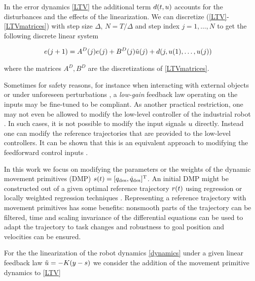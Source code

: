 \noindent In the error dynamics \eqref{LTV} the additional term $d(t,u)$ accounts for the disturbances and the effects of the linearization. We can discretize (\ref{LTV}-\ref{LTVmatrices}) with step size $\Delta$, $N = T/\Delta$ and step index $j = 1, \ldots, N$ to get the following discrete linear system

\begin{equation}
\begin{aligned}
e(j+1) = A^{D}(j)e(j) + B^{D}(j)\tilde{u}(j) + d(j, u(1), \ldots, u(j))
\end{aligned}
\label{discreteLTV}
\end{equation}

where the matrices $A^{D}, B^{D}$ are the discretizations of \eqref{LTVmatrices}. 

Sometimes for safety reasons, for instance when interacting with external objects or under unforeseen perturbations \cite{Schaal07}, a \emph{low-gain} feedback law operating on the inputs may be fine-tuned to be compliant. As another practical restriction, one may not even be allowed to modify the low-level controller of the industrial robot \cite{Longman2000}. In such cases, it is not possible to modify the input signals $u$ directly. Instead one can modify the reference trajectories that are provided to the low-level controllers. It can be shown that this is an equivalent approach to modifying the feedforward control inputs \cite{Bristow06}.

In this work we focus on modifying the parameters or the weights of the dynamic movement primitives (DMP) $s(t) = [q_{\text{des}},\dot{q}_{\text{des}}]^{\mathrm{T}}$. An initial DMP might be constructed out of a given optimal reference trajectory $r(t)$ using regression or locally weighted regression techniques \cite{Ijspeert13}. Representing a reference trajectory with movement primitives has some benefits: nonsmooth parts of the trajectory can be filtered, time and scaling invariance of the differential equations can be used to adapt the trajectory to task changes and robustness to goal position and velocities can be ensured.


For the the linearization of the robot dynamics \eqref{dynamics} under a given linear feedback law $\tilde{u} = -K(y - s)$ we consider the addition of the movement primitive dynamics to \eqref{LTV} 


